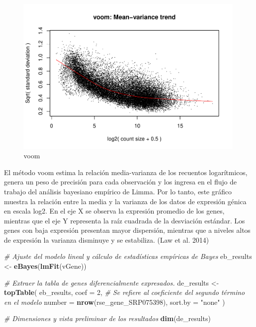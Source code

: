 \documentclass[
]{article}
\newenvironment{Shaded}{\begin{snugshade}}{\end{snugshade}}
\newcommand{\AttributeTok}[1]{\textcolor[rgb]{0.13,0.29,0.53}{#1}}
\newcommand{\CommentTok}[1]{\textcolor[rgb]{0.56,0.35,0.01}{\textit{#1}}}
\newcommand{\DecValTok}[1]{\textcolor[rgb]{0.00,0.00,0.81}{#1}}
\newcommand{\FunctionTok}[1]{\textcolor[rgb]{0.13,0.29,0.53}{\textbf{#1}}}
\newcommand{\NormalTok}[1]{#1}
\newcommand{\OtherTok}[1]{\textcolor[rgb]{0.56,0.35,0.01}{#1}}
\newcommand{\StringTok}[1]{\textcolor[rgb]{0.31,0.60,0.02}{#1}}
\begin{document}
\begin{figure}
\centering
\includegraphics{Proyecto_RNAseq_files/figure-latex/unnamed-chunk-13-1.pdf}
\caption{voom}
\end{figure}

El método voom estima la relación media-varianza de los recuentos
logarítmicos, genera un peso de precisión para cada observación y los
ingresa en el flujo de trabajo del análisis bayesiano empírico de Limma.
Por lo tanto, este gráfico muestra la relación entre la media y la
varianza de los datos de expresión génica en escala log2. En el eje X se
observa la expresión promedio de los genes, mientras que el eje Y
representa la raíz cuadrada de la desviación estándar. Los genes con
baja expresión presentan mayor dispersión, mientras que a niveles altos
de expresión la varianza disminuye y se estabiliza. (Law et al. 2014)

\begin{Shaded}
\begin{Highlighting}[]
\CommentTok{\# Ajuste del modelo lineal y cálculo de estadísticas empíricas de Bayes}
\NormalTok{eb\_results }\OtherTok{\textless{}{-}} \FunctionTok{eBayes}\NormalTok{(}\FunctionTok{lmFit}\NormalTok{(vGene))}


\CommentTok{\# Extraer la tabla de genes diferencialmente expresados.}
\NormalTok{de\_results }\OtherTok{\textless{}{-}} \FunctionTok{topTable}\NormalTok{(}
\NormalTok{    eb\_results,}
    \AttributeTok{coef =} \DecValTok{2}\NormalTok{, }\CommentTok{\# Se refiere al coeficiente del segundo término en el modelo}
    \AttributeTok{number =} \FunctionTok{nrow}\NormalTok{(rse\_gene\_SRP075398),}
    \AttributeTok{sort.by =} \StringTok{"none"}
\NormalTok{)}

\CommentTok{\# Dimensiones y vista preliminar de los resultados}
\FunctionTok{dim}\NormalTok{(de\_results)}
\end{Highlighting}
\end{Shaded}
\end{document}

